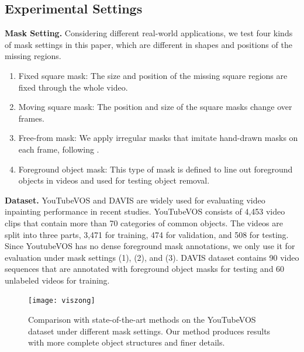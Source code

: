 \subsection{Experimental Settings}
\noindent \textbf{Mask Setting.} Considering different real-world applications, we test four kinds of mask settings in this paper, which are different in shapes and positions of the missing regions. 
\begin{enumerate}
\item Fixed square mask: The size and position of the missing square regions are fixed through the whole video. 
\item Moving square mask: The position and size of the square masks change over frames. 
\item Free-from mask: We apply irregular masks that imitate hand-drawn masks on each frame, following \cite{liu2018partialinpainting}. 
\item Foreground object mask: This type of mask is defined to line out foreground objects in videos and used for testing object removal.
\end{enumerate}

\noindent\textbf{Dataset.} 
YouTubeVOS and DAVIS are widely used for evaluating video inpainting performance in recent studies.
YouTubeVOS consists of 4,453 video clips that contain more than 70 categories of common objects. 
The videos are split into three parts, 3,471 for training, 474 for validation, and 508 for testing. Since YoutubeVOS has no dense foreground mask annotations, we only use it for evaluation under mask settings (1), (2), and (3). 
% 
DAVIS dataset contains 90 video sequences that are annotated with foreground object masks for testing and 60 unlabeled videos for training.






\begin{figure}[tb]	
\centering	
	\texttt{[image: viszong]} %
	\caption{Comparison with state-of-the-art methods on the YouTubeVOS dataset under different mask settings. Our method 	produces results with more complete object structures and finer details.}	
\label{viszong}
\end{figure}



